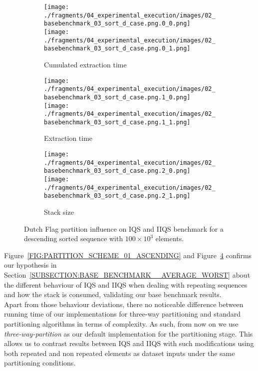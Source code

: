 \begin{figure}
    \centering
    \begin{subfigure}[b]{\textwidth}
        \centering
        \texttt{[image: ./fragments/04\_experimental\_execution/images/02\_basebenchmark\_03\_sort\_d\_case.png.0\_0.png]}
        \texttt{[image: ./fragments/04\_experimental\_execution/images/02\_basebenchmark\_03\_sort\_d\_case.png.0\_1.png]}
        \caption{Cumulated extraction time}
        \label{FIG:PARTITION_SCHEME_01_DESCENDING__0_0}
    \end{subfigure}

    \begin{subfigure}[b]{\textwidth}
        \centering
        \texttt{[image: ./fragments/04\_experimental\_execution/images/02\_basebenchmark\_03\_sort\_d\_case.png.1\_0.png]}
        \texttt{[image: ./fragments/04\_experimental\_execution/images/02\_basebenchmark\_03\_sort\_d\_case.png.1\_1.png]}
        \caption{Extraction time}
        \label{FIG:PARTITION_SCHEME_01_DESCENDING__0_0}
    \end{subfigure}

    \begin{subfigure}[b]{\textwidth}
        \centering
        \texttt{[image: ./fragments/04\_experimental\_execution/images/02\_basebenchmark\_03\_sort\_d\_case.png.2\_0.png]}
        \texttt{[image: ./fragments/04\_experimental\_execution/images/02\_basebenchmark\_03\_sort\_d\_case.png.2\_1.png]}
        \caption{Stack size}
        \label{FIG:PARTITION_SCHEME_01_DESCENDING__0_0}
    \end{subfigure}
    
    \caption{Dutch Flag partition influence on IQS and IIQS benchmark for a descending sorted sequence with $100\times10^3$ elements.}
    \label{FIG:PARTITION_SCHEME_01_DESCENDING}
\end{figure}


Figure~\ref{FIG:PARTITION_SCHEME_01_ASCENDING} and Figure~\ref{FIG:PARTITION_SCHEME_01_DESCENDING} confirms our hypothesis in Section~\ref{SUBSECTION:BASE_BENCHMARK__AVERAGE_WORST} about the different behaviour of IQS and IIQS when dealing with repeating sequences and how the stack is consumed, validating our base benchmark results.\\

Apart from those behaviour deviations, there no noticeable difference between running time of our implementations for three-way partitioning and standard partitioning algorithms in terms of complexity. As such, from now on we use \textit{three-way-partition} as our default implementation for the partitioning stage. This allows us to contrast results between IQS and IIQS with such modifications using both repeated and non repeated elements as dataset inputs under the same partitioning conditions.\\

\FloatBarrier